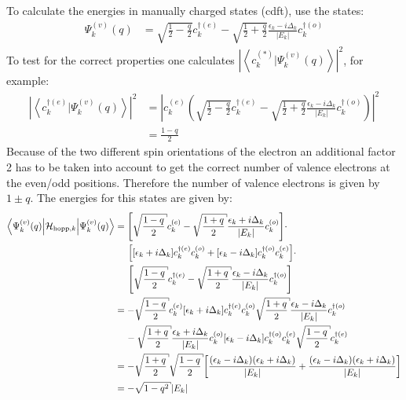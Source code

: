 To calculate the energies in manually charged states (cdft), use the states:
\begin{align}
\Psi_k^{(v)}(q) &= \sqrt{\frac{1}{2}-\frac{q}{2}}c_k^{\dagger(e)}- \sqrt{\frac{1}{2}+\frac{q}{2}}\frac{\epsilon_k - i \Delta_k}{|E_k|}c_{k}^{\dagger(o)}
\end{align}
To test for the correct properties one calculates $\left|\left\langle c^{(*)}_k|\Psi_k^{(v)}(q)\right\rangle\right|^2$, for example:
\begin{align}
\left|\left\langle c^{\dagger(e)}_k|\Psi_k^{(v)}(q)\right\rangle\right|^2 &= \left|c_k^{(e)} \left(\sqrt{\frac{1}{2}-\frac{q}{2}}c_k^{\dagger(e)}- \sqrt{\frac{1}{2}+\frac{q}{2}}\frac{\epsilon_k - i \Delta_k}{|E_k|}c_{k}^{\dagger(o)}\right)\right|^2\\
&= \frac{1-q}{2}
\end{align}
Because of the two different spin orientations of the electron an additional factor 2 has to be taken into account to get the correct number of valence electrons at the even/odd positions. Therefore the number of valence electrons is given by $1 \pm q$. The energies for this states are given by:
\begin{align}
\left\langle\Psi_k^{(v)}(q)\Big|\mathcal{H}_{\text{hopp},k}\Big|\Psi_k^{(v)}(q)\right\rangle &= \left[\sqrt{\frac{1-q}{2}}c_k^{(e)}- \sqrt{\frac{1+q}{2}}\frac{\epsilon_k + i \Delta_k}{|E_k|}c_{k}^{(o)}\right]\cdot\nonumber\\
&\hspace*{0.5cm}\left[
\left[\epsilon_k + i\Delta_k\right]c_{k}^{\dagger(e)}c_{k}^{(o)} + \left[\epsilon_k-i\Delta_k \right]	c_{k}^{\dagger(o)}c_{k}^{(e)}
\right]\cdot\nonumber\\
&\hspace*{0.5cm}\left[\sqrt{\frac{1-q}{2}}c_k^{\dagger(e)}- \sqrt{\frac{1+q}{2}}\frac{\epsilon_k - i \Delta_k}{|E_k|}c_{k}^{\dagger(o)}\right]\\
&=-\sqrt{\frac{1-q}{2}}c_k^{(e)}\left[\epsilon_k+i\Delta_k \right]	c_{k}^{\dagger(e)}c_{k}^{(o)}\sqrt{\frac{1+q}{2}}\frac{\epsilon_k - i \Delta_k}{|E_k|}c_{k}^{\dagger(o)}\nonumber\\
&\hspace*{0.4cm}-\sqrt{\frac{1+q}{2}}\frac{\epsilon_k + i \Delta_k}{|E_k|}c_{k}^{(o)}\left[\epsilon_k - i\Delta_k\right]c_{k}^{\dagger(o)}c_{k}^{(e)}\sqrt{\frac{1-q}{2}}c_k^{\dagger(e)}\\
&=-\sqrt{\frac{1+q}{2}}\sqrt{\frac{1-q}{2}}\left[\frac{(\epsilon_k-i\Delta_k)(\epsilon_k+i\Delta_k)}{|E_k|}+\frac{(\epsilon_k-i\Delta_k)(\epsilon_k+i\Delta_k)}{|E_k|}\right]\\
&= -\sqrt{1-q^2} |E_k|
\end{align}

